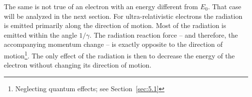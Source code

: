 \documentclass[../sands-adaptation.tex]{subfiles}
\begin{document}
The same is not true of an electron with an energy different from $E_0$. That
case will be analyzed in the next section.
For ultra-relativistic electrons the radiation is emitted primarily along the direction of motion. Most of the radiation is emitted within the angle $1/\gamma$. The radiation reaction force -- and therefore, the accompanying momentum change -- is exactly opposite to the direction
 of motion\footnote{Neglecting quantum effects; see Section~\ref{sec:5.1}}. The only effect of the radiation is then to decrease the energy of the electron without changing its direction
 of motion.
\end{document}
